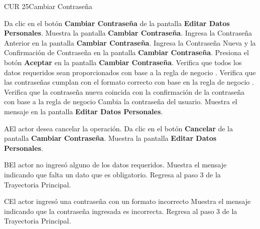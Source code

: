 \begin{UseCase}{CUR 25}{Cambiar Contraseña}
{\begin{UClist}
	    \end{UClist}
	}
 \end{UseCase}

 \begin{UCtrayectoria}
 	
 	\UCpaso [\UCactor] Da clic en el botón \textbf{Cambiar Contraseña} de la pantalla \textbf{Editar Datos Personales}.
 	\UCpaso Muestra la pantalla \textbf{Cambiar Contraseña}.
 	\UCpaso [\UCactor] Ingresa la Contraseña Anterior en la pantalla \textbf{Cambiar Contraseña}.
 	\UCpaso [\UCactor] Ingresa la Contraseña Nueva y la Confirmación de Contraseña en la pantalla \textbf{Cambiar Contraseña}.
 	\UCpaso [\UCactor] Presiona el botón \textbf{Aceptar} en la pantalla \textbf{Cambiar Contraseña}.
 	\UCpaso Verifica que todos los datos requeridos sean proporcionados con base a la regla de negocio .
 	\UCpaso Verifica que las contraseñas cumplan con el formato correcto con base en la regla de negocio .
 	\UCpaso Verifica que la contraseña nueva coincida con la confirmación de la contraseña con base a la regla de negocio 
 	\UCpaso Cambia la contraseña del usuario.
 	\UCpaso Muestra el mensaje  en la pantalla \textbf{Editar Datos Personales}.
     
 \end{UCtrayectoria}

 \begin{UCtrayectoriaA}{A}{El actor desea cancelar la operación.}
 	\UCpaso [\UCactor] Da clic en el botón \textbf{Cancelar} de la pantalla \textbf{Cambiar Contraseña}.
 	\UCpaso Muestra la pantalla \textbf{Editar Datos Personales}.
    
 \end{UCtrayectoriaA}

 \begin{UCtrayectoriaA}{B}{El actor no ingresó alguno de los datos requeridos.}
	\UCpaso [\UCactor] Muestra el mensaje  indicando que falta un dato que es obligatorio.
	\UCpaso Regresa al paso 3 de la Trayectoria Principal.
	
\end{UCtrayectoriaA} 

\begin{UCtrayectoriaA}{C}{El actor ingresó una contraseña con un formato incorrecto}
	\UCpaso [\UCactor] Muestra el mensaje  indicando que la contraseña ingresada es incorrecta.
	\UCpaso Regresa al paso 3 de la Trayectoria Principal.
	
\end{UCtrayectoriaA} 


